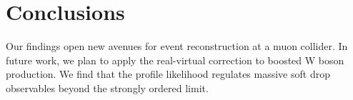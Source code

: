 \section{Conclusions}\label{sec:conclusions}

Our findings open new avenues for event reconstruction at a muon
collider. In future work, we plan to apply the real-virtual correction
to boosted W boson production. We find that the profile likelihood
regulates massive soft drop observables beyond the strongly ordered
limit.

